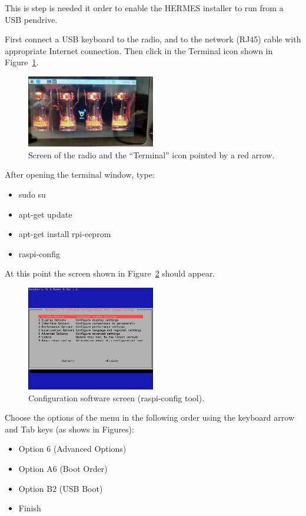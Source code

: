 \documentclass[11pt,a4paper]{article}
\begin{document}
This is step is needed it order to enable the HERMES installer to run from a USB pendrive.

First connect a USB keyboard to the radio, and to the network (RJ45) cable with appropriate Internet connection.
Then click in the Terminal icon shown in Figure~\ref{fig:terminal}.

\begin{figure}[!ht]
  \centering
  \includegraphics[width=0.5\textwidth]{pictures/screen1-edited.jpeg}
  \caption{Screen of the radio and the ``Terminal'' icon pointed by a red arrow.}
  \label{fig:terminal}
\end{figure}

After opening the terminal window, type:

\begin{itemize}
\item sudo su
\item apt-get update
\item apt-get install rpi-eeprom
\item raspi-config
\end{itemize}

At this point the screen shown in Figure~\ref{fig:screen3} should appear.

\begin{figure}[!ht]
  \centering
  \includegraphics[width=0.5\textwidth]{pictures/screen3.jpg}
  \caption{Configuration software screen (raspi-config tool).}
  \label{fig:screen3}
\end{figure}

Choose the options of the menu in the following order using the keyboard arrow and Tab keys (as shows in Figures):
\begin{itemize}
\item Option 6 (Advanced Options)
\item Option A6 (Boot Order)
\item Option B2 (USB Boot)
\item Finish
\end{itemize}
\end{document}
